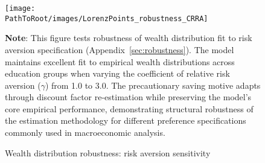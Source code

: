 \documentclass[\PathToRoot/\ProjectName]{subfiles}
\begin{document}
\begin{figure}[htb] 
  \centering
  \caption{Wealth distribution robustness: risk aversion sensitivity}
  \whenintegrated{\label{fig:LorenzPts_robustness_CRRA}} 
  \texttt{[image: \\PathToRoot/images/LorenzPoints\_robustness\_CRRA]}

  \medskip
  \noindent\parbox{\textwidth}{\footnotesize
    \textbf{Note}: This figure tests robustness of wealth distribution fit to risk aversion specification
    (Appendix~\ref{sec:robustness}).
    The model maintains excellent fit to empirical wealth distributions across education groups
    when varying the coefficient of relative risk aversion ($\gamma$) from 1.0 to 3.0.
    The precautionary saving motive adapts through discount factor re-estimation while preserving
    the model's core empirical performance, demonstrating structural robustness of the estimation
    methodology for different preference specifications commonly used in macroeconomic analysis.
  }
\end{figure}

\vspace{0.5em}

\smartbib
\end{document}

